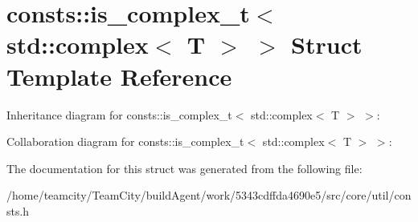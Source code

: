 \hypertarget{structconsts_1_1is__complex__t_3_01std_1_1complex_3_01T_01_4_01_4}{}\section{consts\+:\+:is\+\_\+complex\+\_\+t$<$ std\+:\+:complex$<$ T $>$ $>$ Struct Template Reference}
\label{structconsts_1_1is__complex__t_3_01std_1_1complex_3_01T_01_4_01_4}


Inheritance diagram for consts\+:\+:is\+\_\+complex\+\_\+t$<$ std\+:\+:complex$<$ T $>$ $>$\+:


Collaboration diagram for consts\+:\+:is\+\_\+complex\+\_\+t$<$ std\+:\+:complex$<$ T $>$ $>$\+:


The documentation for this struct was generated from the following file\+:\begin{DoxyCompactItemize}
\item 
/home/teamcity/\+Team\+City/build\+Agent/work/5343cdffda4690e5/src/core/util/consts.\+h\end{DoxyCompactItemize}
